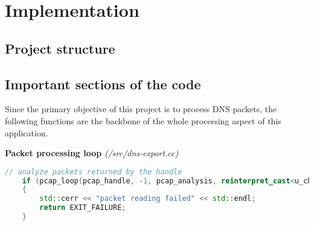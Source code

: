 
\section{Implementation}

\subsection{Project structure}


\subsection{Important sections of the code}

Since the primary objective of this project is to process DNS packets, the following functions are the backbone of the whole processing aspect of this application.

\vspace{1cm}
\textbf{Packet processing loop} \textit{(/src/dns-export.cc)}
\begin{lstlisting}[language=C++] 
    // analyze packets returned by the handle
    if (pcap_loop(pcap_handle, -1, pcap_analysis, reinterpret_cast<u_char*>(&link_type)) != 0)
    {
        std::cerr << "packet reading failed" << std::endl;
        return EXIT_FAILURE;
    }
\end{lstlisting}

